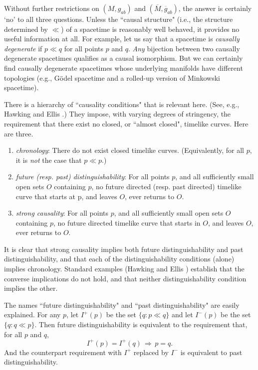 \documentclass [12] {article}
\theoremstyle{plain}
\numberwithin{figure}{subsection}
\numberwithin{proposition}{subsection}
\begin{document}
Without further restrictions on  $(M, g_{ab})$ and   $(\overline{M}, \overline{g}_{ab})$, the answer is certainly `no' to all three questions.  Unless the ``causal structure"  (i.e., the structure determined by $\ll $) of a spacetime is reasonably well behaved, it provides no useful information at all. For example, let us say that a spacetime is \emph{causally degenerate} if $p \ll q$ for all points $p$ and $q$. \emph{Any} bijection between two causally degenerate spacetimes qualifies as a causal isomorphism.  But we can certainly find causally degenerate spacetimes whose underlying manifolds have different topologies (e.g., G\"odel spacetime and a rolled-up version of Minkowski spacetime).

There is a hierarchy of ``causality conditions" that is relevant here.  (See, e.g., Hawking and Ellis .)  They impose, with varying degrees of stringency, the requirement that there exist no closed, or ``almost closed",  timelike curves. Here are three. 
%
\begin{enumerate}
\item [{}] \hspace{-2em} \emph{chronology}:  There do not exist closed timelike curves.  (Equivalently, for all $p$,  it is  \emph{not} the case that $p \ll p$.)
\item [{}]\hspace{-2em} \emph{future (resp.  past) distinguishability}:   For all points $p$, and all sufficiently small open sets $O$ containing $p$, no future directed (resp. past directed) timelike curve that starts at p, and leaves $O$, ever returns to $O$.  
\item [{}]\hspace{-2em}  \emph{strong causality}:    For all points $p$, and all sufficiently small open sets $O$ containing $p$, no future directed timelike curve that starts in $O$, and  leaves $O$,   ever returns to $O$.   
\end{enumerate}
%
It is clear that strong causality implies both future distinguishability and past distinguishability, and that each of the distinguishability conditions (alone) implies chronology.  Standard  examples (Hawking and Ellis ) establish that the converse implications do not hold, and that neither distinguishability condition implies the  other. 

The names ``future distinguishability"  and ``past distinguishability" are  easily explained. For any $p$, let   $I^+(p)$ be the set $\{q: p \ll q\}$ and let  $I^-(p)$ be the set $\{q: q \ll p\}$.  Then  future distinguishability is equivalent to the requirement that,  for all $p$ and $q$, 
\begin{equation*}   
I^+(p) = I^+(q) \, \Rightarrow   \,  p=q.  
\end{equation*}   
And the counterpart requirement  with $I^+$ replaced by $I^-$ is equivalent to past distinguishability. 
  
\end{document}

